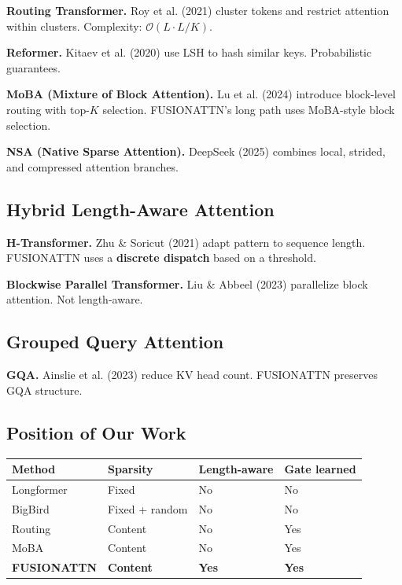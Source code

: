 \textbf{Routing Transformer.} Roy et al. (2021) cluster tokens and restrict 
attention within clusters. Complexity: $\mathcal{O}(L \cdot L/K)$.

\textbf{Reformer.} Kitaev et al. (2020) use LSH to hash similar keys. Probabilistic 
guarantees.

\textbf{MoBA (Mixture of Block Attention).} Lu et al. (2024) introduce block-level 
routing with top-$K$ selection. FUSIONATTN's long path uses MoBA-style 
block selection.

\textbf{NSA (Native Sparse Attention).} DeepSeek (2025) combines local, strided, 
and compressed attention branches.

\subsection{Hybrid Length-Aware Attention}

\textbf{H-Transformer.} Zhu \& Soricut (2021) adapt pattern to sequence length. 
FUSIONATTN uses a \textbf{discrete dispatch} based on a threshold.

\textbf{Blockwise Parallel Transformer.} Liu \& Abbeel (2023) parallelize block 
attention. Not length-aware.

\subsection{Grouped Query Attention}

\textbf{GQA.} Ainslie et al. (2023) reduce KV head count. FUSIONATTN preserves 
GQA structure.

\subsection{Position of Our Work}

\begin{table}[H]
\centering
\small
\begin{tabular}{llll}
\toprule
\textbf{Method} & \textbf{Sparsity} & \textbf{Length-aware} & \textbf{Gate learned} \\
\midrule
Longformer & Fixed & No & No \\
BigBird & Fixed + random & No & No \\
Routing & Content & No & Yes \\
MoBA & Content & No & Yes \\
\textbf{FUSIONATTN} & \textbf{Content} & \textbf{Yes} & \textbf{Yes} \\
\bottomrule
\end{tabular}
\end{table}

